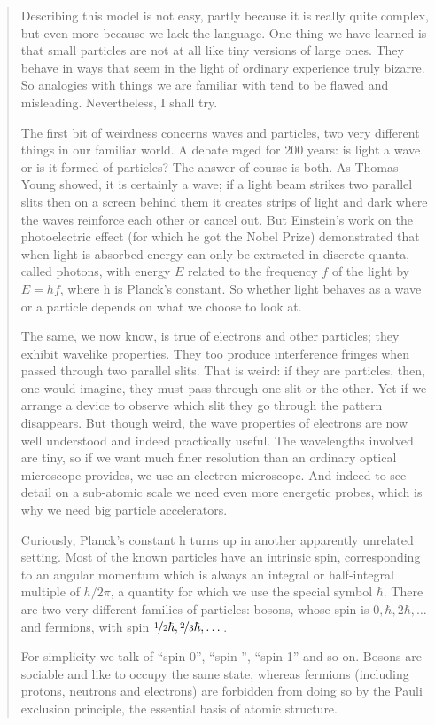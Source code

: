 \begin{quote}
Describing this model is not easy, partly because it is really quite complex, but even more because we lack the language. One thing we have learned is that small particles are not at all like tiny versions of large ones. They behave in ways that seem in the light of ordinary experience truly bizarre. So analogies with things we are familiar with tend to be flawed and misleading. Nevertheless, I shall try.

The first bit of weirdness concerns waves and particles, two very different things in our familiar world. A debate raged for 200 years: is light a wave or is it formed of particles? The answer of course is both. As Thomas Young showed, it is certainly a wave; if a light beam strikes two parallel slits then on a screen behind them it creates strips of light and dark where the waves reinforce each other or cancel out. But Einstein’s work on the photoelectric effect (for which he got the Nobel Prize) demonstrated that when light is absorbed energy can only be extracted in discrete quanta, called photons, with energy $E$ related to the frequency $f$ of the light by $E = hf$, where h is Planck’s constant. So whether light behaves as a wave or a particle depends on what we choose to look at.

The same, we now know, is true of electrons and other particles; they exhibit wavelike properties. They too produce interference fringes when passed through two parallel slits. That is weird: if they are particles, then, one would imagine, they must pass through one slit or the other. Yet if we arrange a device to observe which slit they go through the pattern disappears. But though weird, the wave properties of electrons are now well understood and indeed practically useful. The wavelengths involved are tiny, so if we want much finer resolution than an ordinary optical microscope provides, we use an electron microscope. And indeed to see detail on a sub-atomic scale we need even more energetic probes, which is why we need big particle accelerators.

Curiously, Planck’s constant h turns up in another apparently unrelated setting. Most of the known particles have an intrinsic spin, corresponding to an angular momentum which is always an integral or half-integral multiple of $h/2\pi$, a quantity for which we use the special symbol $\hbar$. There are two very different families of particles: bosons, whose spin is $0,\hbar,2\hbar,\dots$ and fermions, with spin $\nicefrac{1}{2}\hbar, \nicefrac{2}{3}\hbar,\dots$.

For simplicity we talk of “spin 0”, “spin ”, “spin 1” and so on. Bosons are sociable and like to occupy the same state, whereas fermions (including protons, neutrons and electrons) are forbidden from doing so by the Pauli exclusion principle, the essential basis of atomic structure.


\end{quote}
